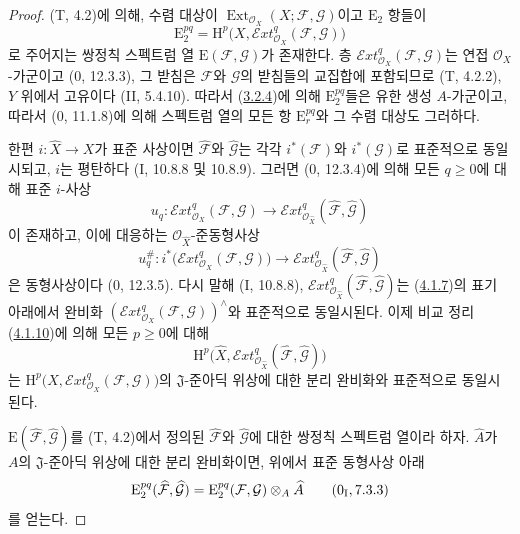 \begin{proof}
(T, 4.2)에 의해, 수렴 대상이
$\operatorname{Ext}_{\mathcal O_X}(X;\mathcal F,\mathcal G)$이고
$\mathrm E_2$ 항들이
\[
\mathrm E_2^{pq}=\mathrm H^p\bigl(X,
\mathcal{E}\!xt^q_{\mathcal O_X}(\mathcal F,\mathcal G)\bigr)
\]
로 주어지는 쌍정칙 스펙트럼 열
$\mathrm E(\mathcal F,\mathcal G)$가 존재한다. 층
$\mathcal{E}\!xt^q_{\mathcal O_X}(\mathcal F,\mathcal G)$는 연접
$\mathcal O_X$-가군이고 (0, 12.3.3), 그 받침은 $\mathcal F$와
$\mathcal G$의 받침들의 교집합에 포함되므로 (T, 4.2.2), $Y$ 위에서
고유이다 (II, 5.4.10). 따라서
(\hyperref[III.3.2.4-fr]{3.2.4})에 의해 $\mathrm E_2^{pq}$들은
유한 생성 $A$-가군이고, 따라서 (0, 11.1.8)에 의해 스펙트럼 열의
모든 항 $\mathrm E_r^{pq}$와 그 수렴 대상도 그러하다.

한편 $i:\widehat X\to X$가 표준 사상이면 $\widehat{\mathcal F}$와
$\widehat{\mathcal G}$는 각각 $i^*(\mathcal F)$와
$i^*(\mathcal G)$로 표준적으로 동일시되고, $i$는 평탄하다
(I, 10.8.8 및 10.8.9). 그러면 (0, 12.3.4)에 의해 모든 $q\geq0$에
대해 표준 $i$-사상
\[
u_q:\mathcal{E}\!xt^q_{\mathcal O_X}(\mathcal F,\mathcal G)
\longrightarrow
\mathcal{E}\!xt^q_{\mathcal O_{\widehat X}}
(\widehat{\mathcal F},\widehat{\mathcal G})
\]
이 존재하고, 이에 대응하는 $\mathcal O_{\widehat X}$-준동형사상
\[
u_q^\#:i^*\bigl(\mathcal{E}\!xt^q_{\mathcal O_X}
(\mathcal F,\mathcal G)\bigr)
\longrightarrow
\mathcal{E}\!xt^q_{\mathcal O_{\widehat X}}
(\widehat{\mathcal F},\widehat{\mathcal G})
\]
은 동형사상이다 (0, 12.3.5). 다시 말해 (I, 10.8.8),
$\mathcal{E}\!xt^q_{\mathcal O_{\widehat X}}
(\widehat{\mathcal F},\widehat{\mathcal G})$는
(\hyperref[III.4.1.7-fr]{4.1.7})의 표기 아래에서 완비화
$(\mathcal{E}\!xt^q_{\mathcal O_X}(\mathcal F,\mathcal G))^\wedge$와
표준적으로 동일시된다. 이제 비교 정리
(\hyperref[III.4.1.10-fr]{4.1.10})에 의해 모든 $p\geq0$에 대해
\[
\mathrm H^p\bigl(\widehat X,
\mathcal{E}\!xt^q_{\mathcal O_{\widehat X}}
(\widehat{\mathcal F},\widehat{\mathcal G})\bigr)
\]
는 $\mathrm H^p\bigl(X,\mathcal{E}\!xt^q_{\mathcal O_X}
(\mathcal F,\mathcal G)\bigr)$의 $\mathfrak J$-준아딕 위상에 대한
분리 완비화와 표준적으로 동일시된다.


$\mathrm E(\widehat{\mathcal F},\widehat{\mathcal G})$를 (T, 4.2)에서
정의된 $\widehat{\mathcal F}$와 $\widehat{\mathcal G}$에 대한 쌍정칙
스펙트럼 열이라 하자. $\widehat A$가 $A$의 $\mathfrak J$-준아딕
위상에 대한 분리 완비화이면, 위에서 표준 동형사상 아래
\[
\mathrm E_2^{pq}(\widehat{\mathcal F},\widehat{\mathcal G})
=\mathrm E_2^{pq}(\mathcal F,\mathcal G)\otimes_A\widehat A
\qquad (0\textsubscript{I}, 7.3.3)
\]
를 얻는다.


\end{proof}
